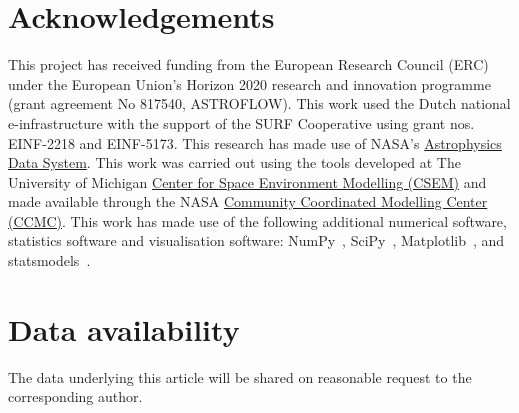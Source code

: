 \section*{Acknowledgements}

    This project has received funding from the European Research Council (ERC) under the European Union's Horizon 2020 research and innovation programme (grant agreement No 817540, ASTROFLOW).
    This work used the Dutch national e-infrastructure with the support of the SURF Cooperative using grant nos. EINF-2218 and EINF-5173.
    This research has made use of NASA's \href{https://ui.adsabs.harvard.edu/}{Astrophysics Data System}.
    This work was carried out using the \swmf{} tools developed at The University of Michigan \href{https://spaceweather.engin.umich.edu/the-center-for-space-environment-modelling-csem/}{Center for Space Environment Modelling (CSEM)} and made available through the NASA \href{https://ccmc.gsfc.nasa.gov/}{Community Coordinated Modelling Center (CCMC)}.
    This work has made use of the following additional numerical software, statistics software and visualisation software:
          NumPy~\citep{2011CSE....13b..22V},
          SciPy~\citep{2020SciPy-NMeth},
     Matplotlib~\citep{2007CSE.....9...90H},
     and
    statsmodels~\citep{seabold2010statsmodels}.

\section*{Data availability}
The data underlying this article will be shared on reasonable request to the corresponding author.

